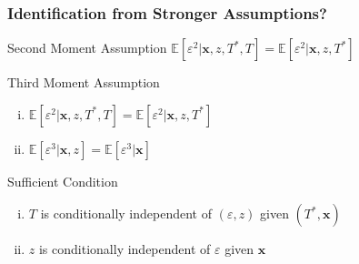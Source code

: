 \documentclass{beamer}
\begin{document}
\begin{frame}
  \frametitle{Identification from Stronger Assumptions?}

  \begin{block}{Second Moment Assumption}
    $\mathbb{E}[\varepsilon^2|\mathbf{x},z,T^*,T] = \mathbb{E}[\varepsilon^2|\mathbf{x},z, T^*]$
  \end{block}

  \begin{block}{Third Moment Assumption}
    \begin{enumerate}[(i)]
    \item $\mathbb{E}[\varepsilon^2|\mathbf{x},z,T^*,T] = \mathbb{E}[\varepsilon^2|\mathbf{x},z, T^*]$
    \item $\mathbb{E}[\varepsilon^3|\mathbf{x},z] = \mathbb{E}[\varepsilon^3|\mathbf{x}]$
  \end{enumerate}
  \end{block}

  \begin{alertblock}{Sufficient Condition}
    \begin{enumerate}[(i)]
      \item $T$ is conditionally independent of $(\varepsilon,z)$ given $(T^*,\mathbf{x})$
      \item $z$ is conditionally independent of $\varepsilon$ given $\mathbf{x}$
    \end{enumerate}
  \end{alertblock}
  
\end{frame}
\end{document}
